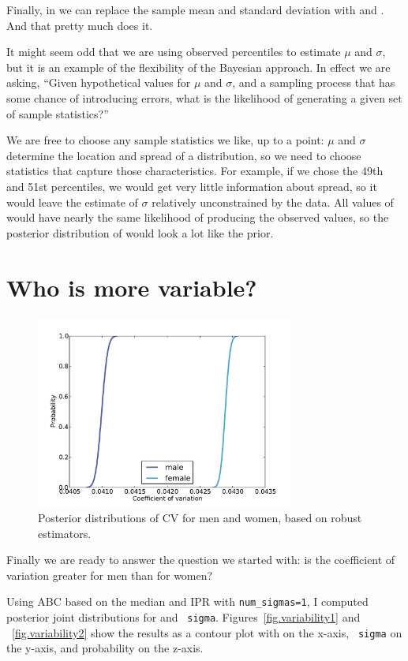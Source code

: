 \documentclass[12pt]{book}
\theoremstyle{exercise}
\begin{document}
Finally, in  we can replace the sample mean and
standard deviation with  and .  And that pretty
much does it.

It might seem odd that we are using observed percentiles to
estimate $\mu$ and $\sigma$, but it is an example of the
flexibility of the Bayesian approach.  In effect we are asking,
``Given hypothetical values for $\mu$ and $\sigma$, and
a sampling process that has some chance of introducing errors,
what is the likelihood of generating a given set of sample
statistics?''

We are free to choose any sample statistics we like, up to a point:
$\mu$ and $\sigma$ determine the location and spread of
a distribution, so we need to choose statistics that capture those
characteristics.  For example, if we chose the 49th and 51st percentiles,
we would get very little information about spread, so it
would leave the estimate of $\sigma$ relatively unconstrained
by the data.  All values of  would have nearly the
same likelihood of producing the observed values, so the posterior
distribution of  would look a lot like the
prior.


\section{Who is more variable?}

\begin{figure}
\centerline{\includegraphics[height=2.5in]{figs/variability_cv.pdf}}
\caption{Posterior distributions of CV for men and women, based on
robust estimators.}
\label{fig.variability3}
\end{figure}

Finally we are ready to answer the question we started with: is the
coefficient of variation greater for men than for women?

Using ABC based on the median and IPR with \verb"num_sigmas=1", I
computed posterior joint distributions for  and {\tt
  sigma}.  Figures~\ref{fig.variability1} and ~\ref{fig.variability2}
show the results as a contour plot with  on the x-axis, {\tt
  sigma} on the y-axis, and probability on the z-axis.
\end{document}
